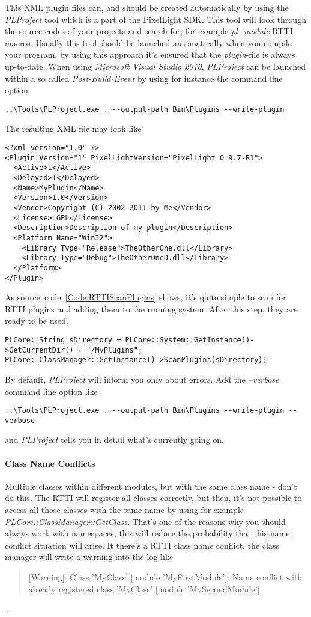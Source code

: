 This XML plugin files can, and should be created automatically by using the \emph{PLProject} tool which is a part of the PixelLight SDK. This tool will look through the source codes of your projects and search for, for example \emph{pl\_module} RTTI macros. Usually this tool should be launched automatically when you compile your program, by using this approach it's ensured that the \emph{plugin}-file is always up-to-date. When using \emph{Microsoft Visual Studio 2010}, \emph{PLProject} can be launched within a so called \emph{Post-Build-Event} by using for instance the command line option
\begin{verbatim}
..\Tools\PLProject.exe . --output-path Bin\Plugins --write-plugin
\end{verbatim}
The resulting XML file may look like
\begin{verbatim}
<?xml version="1.0" ?>
<Plugin Version="1" PixelLightVersion="PixelLight 0.9.7-R1">
  <Active>1</Active>
  <Delayed>1</Delayed>
  <Name>MyPlugin</Name>
  <Version>1.0</Version>
  <Vendor>Copyright (C) 2002-2011 by Me</Vendor>
  <License>LGPL</License>
  <Description>Description of my plugin</Description>
  <Platform Name="Win32">
    <Library Type="Release">TheOtherOne.dll</Library>
    <Library Type="Debug">TheOtherOneD.dll</Library>
  </Platform>
</Plugin>
\end{verbatim}

As source~code~\ref{Code:RTTIScanPlugins} shows, it's quite simple to scan for RTTI plugins and adding them to the running system. After this step, they are ready to be used.
\begin{lstlisting}[float=htb,label=Code:RTTIScanPlugins,caption={Scanning for RTTI plugins to add}]
PLCore::String sDirectory = PLCore::System::GetInstance()->GetCurrentDir() + "/MyPlugins";
PLCore::ClassManager::GetInstance()->ScanPlugins(sDirectory);
\end{lstlisting}

By default, \emph{PLProject} will inform you only about errors. Add the \emph{--verbose} command line option like
\begin{verbatim}
..\Tools\PLProject.exe . --output-path Bin\Plugins --write-plugin --verbose
\end{verbatim}
and \emph{PLProject} tells you in detail what's currently going on.


\paragraph{Class Name Conflicts}
Multiple classes within different modules, but with the same class name - don't do this. The RTTI will register all classes correctly, but then, it's not possible to access all those classes with the same name by using for example \emph{PLCore::ClassManager::GetClass}. That's one of the reasons why you should always work with namespaces, this will reduce the probability that this name conflict situation will arise. It there's a RTTI class name conflict, the class manager will write a warning into the log like
\begin{quote}[Warning]: Class 'MyClass' [module 'MyFirstModule']: Name conflict with already registered class 'MyClass' [module 'MySecondModule']\end{quote}.


